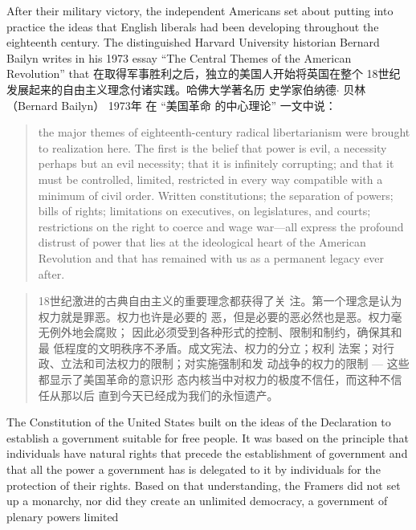 \begin{paracol}{2}
After their military victory, the independent Americans set
about putting into practice the ideas that English liberals had
been developing throughout the eighteenth century. The distinguished Harvard University historian Bernard Bailyn writes in his 1973 essay ``The Central Themes of the American Revolution'' that
\switchcolumn
在取得军事胜利之后，独立的美国人开始将英国在整个
18世纪发展起来的自由主义理念付诸实践。哈佛大学著名历
史学家伯纳德$\cdot$ 贝林（Bernard  Bailyn） 1973年 在 “美国革命
的中心理论” 一文中说：
\switchcolumn*
\begin{quote}
the major themes of eighteenth-century radical libertarianism were brought to realization here. The first is the belief that
power is evil, a necessity perhaps but an evil necessity; that it is
infinitely corrupting; and that it must be controlled, limited, restricted in every way compatible with a minimum of civil order.
Written constitutions; the separation of powers; bills of rights;
limitations on executives, on legislatures, and courts; restrictions
on the right to coerce and wage war---all express the profound
distrust of power that lies at the ideological heart of the American Revolution and that has remained with us as a permanent legacy ever after.
\end{quote}
\switchcolumn
\begin{quote}
18世纪激进的古典自由主义的重要理念都获得了关
注。第一个理念是认为权力就是罪恶。权力也许是必要的
恶，但是必要的恶必然也是恶。权力毫无例外地会腐败；
因此必须受到各种形式的控制、限制和制约，确保其和最
低程度的文明秩序不矛盾。成文宪法、权力的分立；权利
法案；对行政、立法和司法权力的限制；对实施强制和发
动战争的权力的限制 --- 这些都显示了美国革命的意识形
态内核当中对权力的极度不信任，而这种不信任从那以后
直到今天已经成为我们的永恒遗产。
\end{quote}
\switchcolumn*
The Constitution of the United States built on the ideas of
the Declaration to establish a government suitable for free people. It was based on the principle that individuals have natural
rights that precede the establishment of government and that
all the power a government has is delegated to it by individuals
for the protection of their rights. Based on that understanding,
the Framers did not set up a monarchy, nor did they create an
unlimited democracy, a government of plenary powers limited

\end{paracol}
